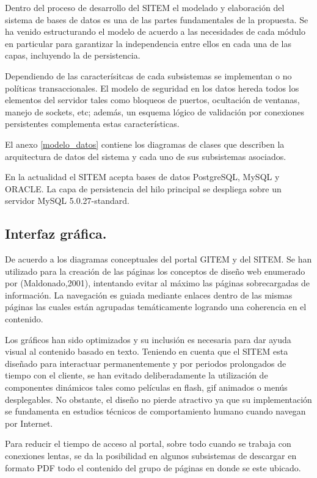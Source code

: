 Dentro del proceso de desarrollo del SITEM el modelado y elaboración del sistema de bases de datos es una de las partes fundamentales de la propuesta. Se ha venido estructurando el modelo de acuerdo a las necesidades de cada módulo en particular para garantizar la independencia entre ellos en cada una de las capas, incluyendo la de persistencia.

Dependiendo de las caracterísitcas de cada subsistemas se implementan o no políticas transaccionales. El modelo de seguridad en los datos hereda todos los elementos del servidor tales como bloqueos de puertos, ocultación de ventanas, manejo de sockets, etc; además, un esquema lógico de validación por conexiones persistentes complementa estas características.

El anexo \ref{modelo_datos} contiene los diagramas de clases que describen la arquitectura de datos del sistema y cada uno de sus subsistemas asociados. 

En la actualidad el SITEM acepta bases de datos PostgreSQL, MySQL y ORACLE. La capa de persistencia del hilo principal se despliega sobre un servidor MySQL 5.0.27-standard.


\subsection{Interfaz gráfica.}

De acuerdo a los diagramas conceptuales del portal GITEM y del SITEM. Se han utilizado para la creación de las páginas los conceptos de diseño web enumerado por (Maldonado,2001), intentando evitar al máximo las páginas sobrecargadas de información. La navegación es guiada mediante enlaces dentro de las mismas páginas las cuales están agrupadas temáticamente logrando una coherencia en el contenido. 

Los gráficos han sido optimizados y su inclusión es necesaria para dar ayuda visual al contenido basado en texto. Teniendo en cuenta que el SITEM esta diseñado para interactuar permanentemente y por periodos prolongados de tiempo con el cliente, se han evitado deliberadamente la utilización  de componentes dinámicos tales como películas en flash, gif animados o menús desplegables. No obstante, el diseño no pierde atractivo ya que su implementación se fundamenta en estudios técnicos de comportamiento humano cuando navegan por Internet.

Para reducir el tiempo de acceso al portal, sobre todo cuando se trabaja con conexiones lentas, se da la posibilidad en algunos subsistemas de descargar en formato PDF todo el contenido del grupo de páginas en donde se este ubicado.

